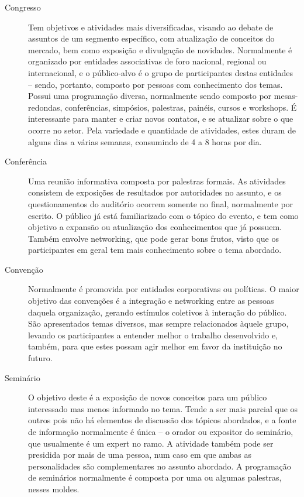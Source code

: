 \documentclass[12pt,a4paper,twoside,hyphens,english,brazil]{abntex2}
\begin{document}
\begin{description}
	\item[Congresso] Tem objetivos e atividades mais diversificadas, visando ao debate de assuntos de um segmento específico, com atualização de conceitos do mercado, bem como exposição e divulgação de novidades. Normalmente é organizado por entidades associativas de foro nacional, regional ou internacional, e o público-alvo é o grupo de participantes destas entidades -- sendo, portanto, composto por pessoas com conhecimento dos temas. Possui uma programação diversa, normalmente sendo composto por mesas-redondas, conferências, simpósios, palestras, painéis, cursos e workshops. É interessante para manter e criar novos contatos, e se atualizar sobre o que ocorre no setor. Pela variedade e quantidade de atividades, estes duram de alguns dias a várias semanas, consumindo de 4 a 8 horas por dia.
	
	\item[Conferência] Uma reunião informativa composta por palestras formais. As atividades consistem de exposições de resultados por autoridades no assunto, e os questionamentos do auditório ocorrem somente no final, normalmente por escrito. O público já está familiarizado com o tópico do evento, e tem como objetivo a expansão ou atualização dos conhecimentos que já possuem. Também envolve networking, que pode gerar bons frutos, visto que os participantes em geral tem mais conhecimento sobre o tema abordado. %
							
	\item[Convenção] Normalmente é promovida por entidades corporativas ou políticas. O maior objetivo das convenções é a integração e networking entre as pessoas daquela organização, gerando estímulos coletivos \`a interação do público. São apresentados temas diversos, mas sempre relacionados \`aquele grupo, levando os participantes a entender melhor o trabalho desenvolvido e, também, para que estes possam agir melhor em favor da instituição no futuro.
	
	\item[Seminário] O objetivo deste é a exposição de novos conceitos para um público interessado mas menos informado no tema. Tende a ser mais parcial que os outros pois não há elementos de discussão dos tópicos abordados, e a fonte de informação normalmente é única -- o orador ou expositor do seminário, que usualmente é um expert no ramo. A atividade também pode ser presidida por mais de uma pessoa, num caso em que ambas as personalidades são complementares no assunto abordado. A programação de seminários normalmente é composta por uma ou algumas palestras, nesses moldes.
					

\end{description}
\end{document}
